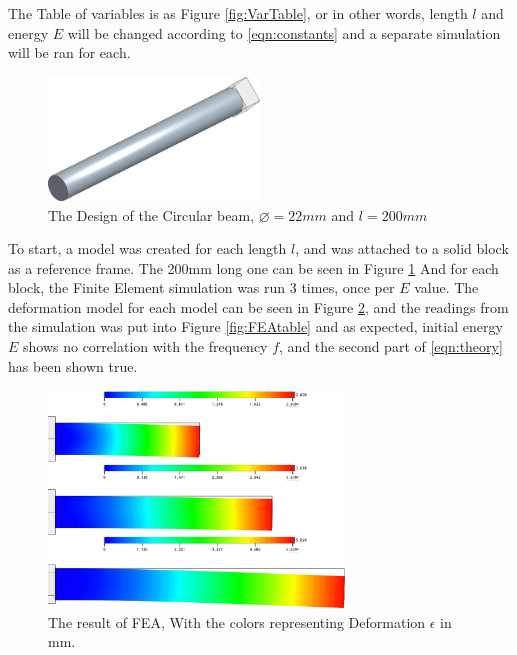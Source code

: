 \documentclass[a4paper,12pt]{article}
\begin{document}
    The Table of variables is as Figure \ref{fig:VarTable}, or in other words, length $l$ and energy $E$ will be changed according to \eqref{eqn:constants} and a separate simulation will be ran for each.
    \begin{figure}[H]%
    \includegraphics[width=0.5\textwidth]{CADPic}
    \centering
    \caption{The Design of the Circular beam, $\diameter=22mm$ and $l=200mm$}\label{fig:CADPic}
    \centering
    \end{figure}
    To start, a model was created for each length $l$, and was attached to a solid block as a reference frame. The 200mm long one can be seen in Figure \ref{fig:CADPic}
    And for each block, the Finite Element simulation was run 3 times, once per $E$ value.
    The deformation model for each model can be seen in Figure \ref{fig:FEAPic}, and the readings from the simulation was put into Figure \ref{fig:FEAtable} and as expected, initial energy $E$ shows no correlation with the frequency $f$, and the second part of \eqref{eqn:theory} has been shown true.
    \begin{figure}[H]%
    \includegraphics[width=0.7\textwidth]{FEA3}
    \centering
    \caption{The result of FEA, With the colors representing Deformation $\epsilon$ in mm.}\label{fig:FEAPic}
    \centering
    \end{figure}
\end{document}
